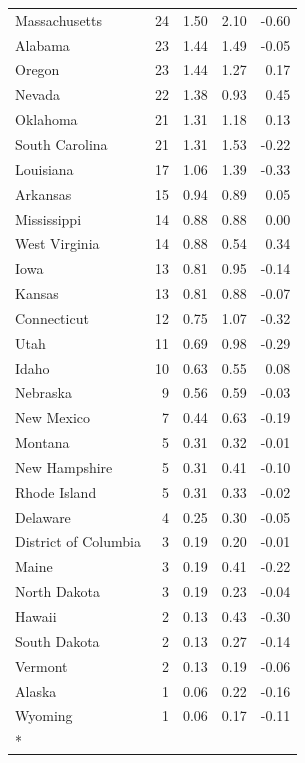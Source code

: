 \begin{longtable}[t]{lrrrr}
Massachusetts & 24 & 1.50 & 2.10 & -0.60\\
Alabama & 23 & 1.44 & 1.49 & -0.05\\
Oregon & 23 & 1.44 & 1.27 & 0.17\\
\addlinespace
Nevada & 22 & 1.38 & 0.93 & 0.45\\
Oklahoma & 21 & 1.31 & 1.18 & 0.13\\
South Carolina & 21 & 1.31 & 1.53 & -0.22\\
Louisiana & 17 & 1.06 & 1.39 & -0.33\\
Arkansas & 15 & 0.94 & 0.89 & 0.05\\
\addlinespace
Mississippi & 14 & 0.88 & 0.88 & 0.00\\
West Virginia & 14 & 0.88 & 0.54 & 0.34\\
Iowa & 13 & 0.81 & 0.95 & -0.14\\
Kansas & 13 & 0.81 & 0.88 & -0.07\\
Connecticut & 12 & 0.75 & 1.07 & -0.32\\
\addlinespace
Utah & 11 & 0.69 & 0.98 & -0.29\\
Idaho & 10 & 0.63 & 0.55 & 0.08\\
Nebraska & 9 & 0.56 & 0.59 & -0.03\\
New Mexico & 7 & 0.44 & 0.63 & -0.19\\
Montana & 5 & 0.31 & 0.32 & -0.01\\
\addlinespace
New Hampshire & 5 & 0.31 & 0.41 & -0.10\\
Rhode Island & 5 & 0.31 & 0.33 & -0.02\\
Delaware & 4 & 0.25 & 0.30 & -0.05\\
District of Columbia & 3 & 0.19 & 0.20 & -0.01\\
Maine & 3 & 0.19 & 0.41 & -0.22\\
\addlinespace
North Dakota & 3 & 0.19 & 0.23 & -0.04\\
Hawaii & 2 & 0.13 & 0.43 & -0.30\\
South Dakota & 2 & 0.13 & 0.27 & -0.14\\
Vermont & 2 & 0.13 & 0.19 & -0.06\\
Alaska & 1 & 0.06 & 0.22 & -0.16\\
\addlinespace
Wyoming & 1 & 0.06 & 0.17 & -0.11\\*
\end{longtable}
\endgroup{}
